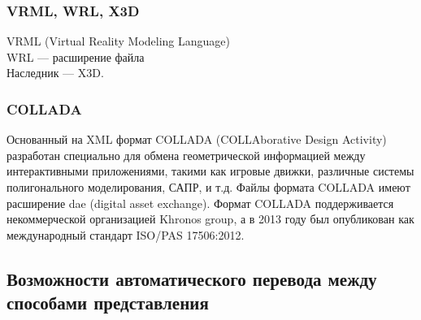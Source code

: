 \subsubsection{VRML, WRL, X3D}\label{sec:secVRML}

VRML (Virtual Reality Modeling Language) \\
WRL --- расширение файла \\
Наследник --- X3D.

\subsubsection{COLLADA}\label{sec:secCOLLADA}


Основанный на XML формат COLLADA (COLLAborative Design Activity) разработан специально для обмена геометрической информацией между интерактивными приложениями, такими как игровые движки, различные системы полигонального моделирования, САПР, и т.д. Файлы формата COLLADA имеют расширение dae (digital asset exchange). Формат COLLADA поддерживается некоммерческой организацией Khronos group, а в 2013 году был опубликован как международный стандарт ISO/PAS 17506:2012.

%                                                                             

\subsection{Возможности автоматического перевода между способами представления}\label{sec:secAutoConversion}


